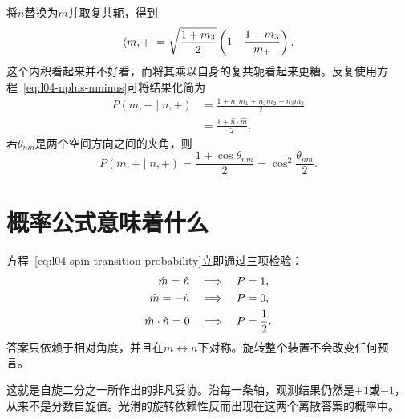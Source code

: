 将\(n\)替换为\(m\)并取复共轭，得到
\begin{equation}
  \left\langle m,+\right\rvert
  =
  \sqrt{\frac{1+m_3}{2}}
  \begin{pmatrix}
    1&
    \dfrac{1-m_3}{m_+}
  \end{pmatrix}.
\end{equation}
这个内积看起来并不好看，而将其乘以自身的复共轭看起来更糟。反复使用方程~\eqref{eq:l04-nplus-nminus}可将结果化简为
\begin{equation}
  \begin{aligned}
    P(m,+\mid n,+)
    &=\frac{1+n_1m_1+n_2m_2+n_3m_3}{2}\\
    &=\frac{1+\hat n\cdot\hat m}{2}.
  \end{aligned}
  \label{eq:l04-spin-transition-probability}
\end{equation}
若\(\theta_{nm}\)是两个空间方向之间的夹角，则
\begin{equation}
  P(m,+\mid n,+)
  =
  \frac{1+\cos\theta_{nm}}{2}
  =
  \cos^2\frac{\theta_{nm}}{2}.
  \label{eq:l04-half-angle-probability}
\end{equation}

\begin{classroomqa}
\end{classroomqa}

\section{概率公式意味着什么}

方程~\eqref{eq:l04-spin-transition-probability}立即通过三项检验：
\begin{align}
  \hat m=\hat n
  &\quad\Longrightarrow\quad P=1,
  \notag\\
  \hat m=-\hat n
  &\quad\Longrightarrow\quad P=0,
  \notag\\
  \hat m\cdot\hat n=0
  &\quad\Longrightarrow\quad P=\frac12.
\end{align}
答案只依赖于相对角度，并且在\(m\leftrightarrow n\)下对称。旋转整个装置不会改变任何预言。

这就是自旋二分之一所作出的非凡妥协。沿每一条轴，观测结果仍然是\(+1\)或\(-1\)，从来不是分数自旋值。光滑的旋转依赖性反而出现在这两个离散答案的概率中。

